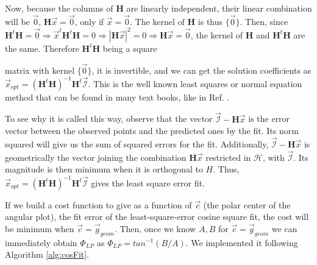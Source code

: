 \documentclass[11pt, a4paper, twoside]{article} %
\DeclareRobustCommand{\mybox}[2][gray!10]{%
\begin{tcolorbox}[   %
        left=0.2cm,
        right=0.2cm,
        top=0.15cm,
        bottom=0.15cm,
        colback=#1,
        colframe=#1,
        width=\dimexpr\textwidth\relax, 
        enlarge left by=0mm,
        boxsep=5pt,
        arc=0pt,outer arc=0pt,
        ]
        #2
\end{tcolorbox}
}
\begin{document}
{Now, because the columns of $\pmb{H}$ are linearly independent, their linear combination will be $\vec{0}$, $\pmb{H}\vec{x}=\vec{0}$, only if $\vec{x}=\vec{0}$. The kernel of $\pmb{H}$ is thus $\{\vec{0}\}$. Then, since $\pmb{H}^t\pmb{H}=\vec{0}\Rightarrow \vec{x}^t\pmb{H}^t\pmb{H}=0\Rightarrow |\pmb{H}\vec{x}|^2=0\Rightarrow \pmb{H}\vec{x}=\vec{0}$, the kernel of $\pmb{H}$ and $\pmb{H}^t\pmb{H}$ are the same. Therefore $\pmb{H}^t\pmb{H}$ being a square}
\mybox{ matrix with kernel $\{\vec{0}\}$, it is invertible, and we can get the solution coefficients as $\vec{x}_{opt}=(\pmb{H}^t\pmb{H})^{-1}\pmb{H}^t\vec{\mathcal{I}}$. This is the well known least squares or normal equation method that can be found in many text books, like in Ref. \cite{leastsquares}.\vspace{0.15cm}

To see why it is called this way, observe that the vector $\vec{\mathcal{I}}-\pmb{H}\vec{x}$ is the error vector between the observed points and the predicted ones by the fit. Its norm squared will give us the sum of squared errors for the fit. Additionally, $\vec{\mathcal{I}}-\pmb{H}\vec{x}$ is geometrically the vector joining the combination $\pmb{H}\vec{x}$ restricted in $\mathcal{H}$, with $\vec{\mathcal{I}}$. Its magnitude is then minimum when it is orthogonal to $H$. Thus, $\vec{x}_{opt}=(\pmb{H}^t\pmb{H})^{-1}\pmb{H}^t\vec{\mathcal{I}}$ gives the least square error fit. 
}
If we build a cost function to give as a function of $\vec{c}$ (the polar center of the angular plot), the fit error of the least-square-error cosine square fit, the cost will be minimum when $\vec{c}=\vec{g}_{geom}$. Then, once we know $A,B$ for $\vec{c}=\vec{g}_{geom}$ we can immediately obtain $\Phi_{LP}$ as $\Phi_{LP}=tan^{-1}(B/A)$. We implemented it following Algorithm \ref{alg:cosFit}.
\end{document}
